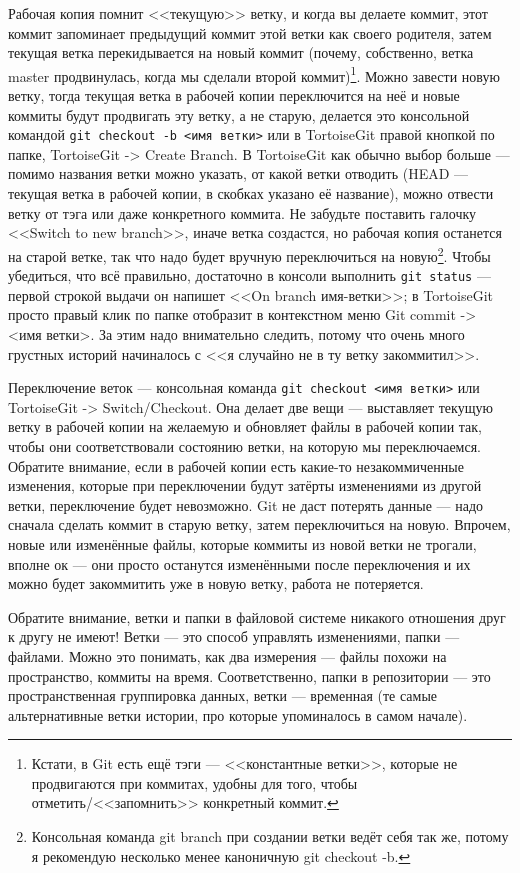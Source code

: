 \documentclass{../../text-style}
\begin{document}
Рабочая копия помнит <<текущую>> ветку, и когда вы делаете коммит, этот коммит запоминает предыдущий коммит этой ветки как своего родителя, затем текущая ветка перекидывается на новый коммит (почему, собственно, ветка master продвинулась, когда мы сделали второй коммит)\footnote{Кстати, в Git есть ещё тэги --- <<константные ветки>>, которые не продвигаются при коммитах, удобны для того, чтобы отметить/<<запомнить>> конкретный коммит.}. Можно завести новую ветку, тогда текущая ветка в рабочей копии переключится на неё и новые коммиты будут продвигать эту ветку, а не старую, делается это консольной командой \verb|git checkout -b <имя ветки>| или в TortoiseGit правой кнопкой по папке, TortoiseGit -> Create Branch. В TortoiseGit как обычно выбор больше --- помимо названия ветки можно указать, от какой ветки отводить (HEAD --- текущая ветка в рабочей копии, в скобках указано её название), можно отвести ветку от тэга или даже конкретного коммита. Не забудьте поставить галочку <<Switch to new branch>>, иначе ветка создастся, но рабочая копия останется на старой ветке, так что надо будет вручную переключиться на новую\footnote{Консольная команда git branch при создании ветки ведёт себя так же, потому я рекомендую несколько менее каноничную git checkout -b.}. Чтобы убедиться, что всё правильно, достаточно в консоли выполнить \verb|git status| --- первой строкой выдачи он напишет <<On branch имя-ветки>>; в TortoiseGit просто правый клик по папке отобразит в контекстном меню Git commit -> <имя ветки>. За этим надо внимательно следить, потому что очень много грустных историй начиналось с <<я случайно не в ту ветку закоммитил>>.

Переключение веток --- консольная команда \verb|git checkout <имя ветки>| или TortoiseGit -> Switch/Checkout. Она делает две вещи --- выставляет текущую ветку в рабочей копии на желаемую и обновляет файлы в рабочей копии так, чтобы они соответствовали состоянию ветки, на которую мы переключаемся. Обратите внимание, если в рабочей копии есть какие-то незакоммиченные изменения, которые при переключении будут затёрты изменениями из другой ветки, переключение будет невозможно. Git не даст потерять данные --- надо сначала сделать коммит в старую ветку, затем переключиться на новую. Впрочем, новые или изменённые файлы, которые коммиты из новой ветки не трогали, вполне ок --- они просто останутся изменёнными после переключения и их можно будет закоммитить уже в новую ветку, работа не потеряется.

Обратите внимание, ветки и папки в файловой системе никакого отношения друг к другу не имеют! Ветки --- это способ управлять изменениями, папки --- файлами. Можно это понимать, как два измерения --- файлы похожи на пространство, коммиты на время. Соответственно, папки в репозитории --- это пространственная группировка данных, ветки --- временная (те самые альтернативные ветки истории, про которые упоминалось в самом начале).
\end{document}
